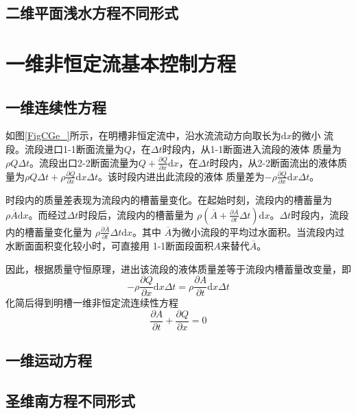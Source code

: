 \subsection{二维平面浅水方程不同形式}

\section{一维非恒定流基本控制方程}
\subsection{一维连续性方程}
如图\ref{FigCGe_}所示，在明槽非恒定流中，沿水流流动方向取长为$\mathrm{d}x$的微小
流段。流段进口1-1断面流量为$Q$，在$\Delta t$时段内，从1-1断面进入流段的液体
质量为$\rho Q\Delta t$。流段出口2-2断面流量为$Q+\frac{\partial Q}{\partial
x}\mathrm{d}x$，在$\Delta t$时段内，从2-2断面流出的液体质量为$\rho Q\Delta
t+\rho\frac{\partial Q}{\partial x}\mathrm{d}x\Delta t$。该时段内进出此流段的液体
质量差为$-\rho\frac{\partial Q}{\partial x}\mathrm{d}x\Delta t$。

时段内的质量差表现为流段内的槽蓄量变化。在起始时刻，流段内的槽蓄量为
$\rho\overline{A}\mathrm{d}x$。而经过$\Delta t$时段后，流段内的槽蓄量为
$\rho\left(\overline{A}+\frac{\partial\overline{A}}{\partial t}\Delta
t\right)\mathrm{d}x$。$\Delta t$时段内，流段内的槽蓄量变化量为
$\rho\frac{\partial \overline{A}}{\partial t}\Delta t\mathrm{d}x$。其中
$\overline{A}$为微小流段的平均过水面积。当流段内过水断面面积变化较小时，可直接用
1-1断面段面积$A$来替代$\overline{A}$。

因此，根据质量守恒原理，进出该流段的液体质量差等于流段内槽蓄量改变量，即
\begin{equation*}
  -\rho\frac{\partial Q}{\partial x}\mathrm{d}x\Delta t
  =
  \rho\frac{\partial A}{\partial t}\mathrm{d}x\Delta t
\end{equation*}
化简后得到明槽一维非恒定流连续性方程
\begin{equation}
  \frac{\partial A}{\partial t}
  +
  \frac{\partial Q}{\partial x}
  =
  0
  \label{EqCGe_SVe_Ce}
\end{equation}



\subsection{一维运动方程}

\subsection{圣维南方程不同形式}
